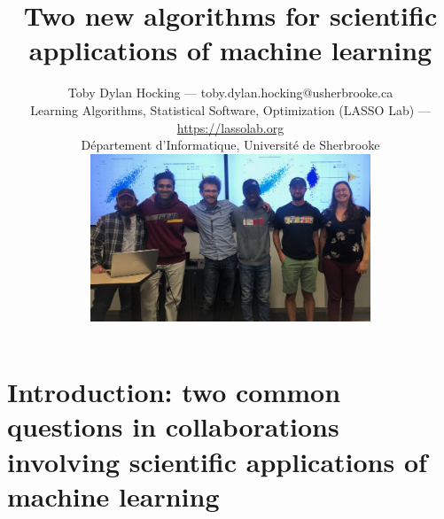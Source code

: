 \documentclass[t]{beamer}
\begin{document}
\title{Two new algorithms for scientific applications of machine learning}

\author{
  Toby Dylan Hocking --- toby.dylan.hocking@usherbrooke.ca\\ 
  Learning Algorithms, Statistical Software, Optimization (LASSO Lab) --- \url{https://lassolab.org}\\
  Département d'Informatique,  Université de Sherbrooke\\
  \includegraphics[height=5cm]{2022-10-14_ML_group_meeting.jpg} \\
}

\date{}

\maketitle

\section{Introduction: two common questions in collaborations involving scientific applications of machine learning}
\end{document}
